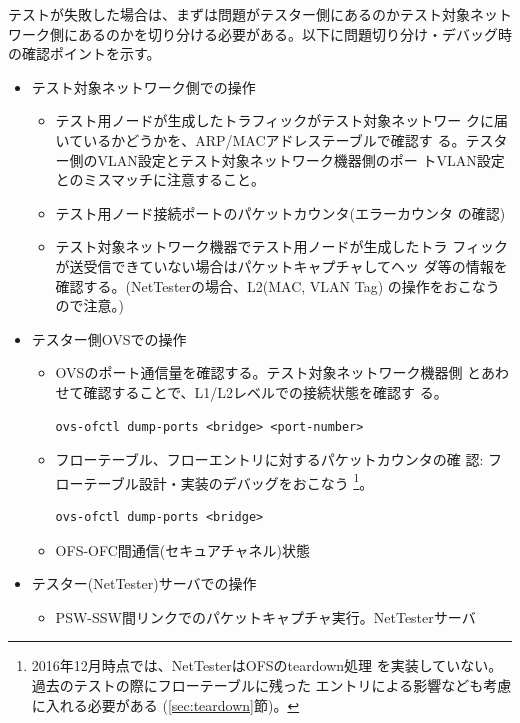 テストが失敗した場合は、まずは問題がテスター側にあるのかテスト対象ネット
ワーク側にあるのかを切り分ける必要がある。以下に問題切り分け・デバッグ時
の確認ポイントを示す。
\begin{itemize}
 \item テスト対象ネットワーク側での操作
       \begin{itemize}
        \item テスト用ノードが生成したトラフィックがテスト対象ネットワー
              クに届いているかどうかを、ARP/MACアドレステーブルで確認す
              る。テスター側のVLAN設定とテスト対象ネットワーク機器側のポー
              トVLAN設定とのミスマッチに注意すること。
        \item テスト用ノード接続ポートのパケットカウンタ(エラーカウンタ
              の確認)
        \item テスト対象ネットワーク機器でテスト用ノードが生成したトラ
              フィックが送受信できていない場合はパケットキャプチャしてヘッ
              ダ等の情報を確認する。(NetTesterの場合、L2(MAC, VLAN Tag)
              の操作をおこなうので注意。)
       \end{itemize}
 \item テスター側OVSでの操作
       \begin{itemize}
        \item OVSのポート通信量を確認する。テスト対象ネットワーク機器側
              とあわせて確認することで、L1/L2レベルでの接続状態を確認す
              る。
\begin{lstlisting}
ovs-ofctl dump-ports <bridge> <port-number>
\end{lstlisting}
        \item フローテーブル、フローエントリに対するパケットカウンタの確
              認: フローテーブル設計・実装のデバッグをおこなう
              \footnote{2016年12月時点では、NetTesterはOFSのteardown処理
              を実装していない。過去のテストの際にフローテーブルに残った
              エントリによる影響なども考慮に入れる必要がある
              (\ref{sec:teardown}節)。}。
\begin{lstlisting}
ovs-ofctl dump-ports <bridge>
\end{lstlisting}
        \item OFS-OFC間通信(セキュアチャネル)状態
       \end{itemize}
 \item テスター(NetTester)サーバでの操作
       \begin{itemize}
        \item PSW-SSW間リンクでのパケットキャプチャ実行。NetTesterサーバ

\end{itemize}
\end{itemize}
